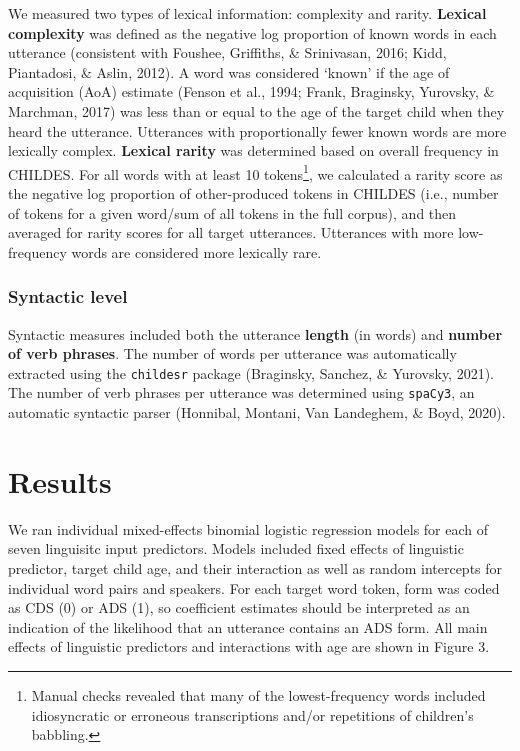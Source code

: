 \documentclass[10pt, letterpaper]{article}
\begin{document}
We measured two types of lexical information: complexity and rarity.
\textbf{Lexical complexity} was defined as the negative log proportion
of known words in each utterance (consistent with Foushee, Griffiths, \&
Srinivasan, 2016; Kidd, Piantadosi, \& Aslin, 2012). A word was
considered `known' if the age of acquisition (AoA) estimate (Fenson et
al., 1994; Frank, Braginsky, Yurovsky, \& Marchman, 2017) was less than
or equal to the age of the target child when they heard the utterance.
Utterances with proportionally fewer known words are more lexically
complex. \textbf{Lexical rarity} was determined based on overall
frequency in CHILDES. For all words with at least 10 tokens\footnote{Manual
  checks revealed that many of the lowest-frequency words included
  idiosyncratic or erroneous transcriptions and/or repetitions of
  children's babbling.}, we calculated a rarity score as the negative
log proportion of other-produced tokens in CHILDES (i.e., number of
tokens for a given word/sum of all tokens in the full corpus), and then
averaged for rarity scores for all target utterances. Utterances with
more low-frequency words are considered more lexically rare.

\hypertarget{syntactic-level}{%
\subsubsection{Syntactic level}\label{syntactic-level}}

Syntactic measures included both the utterance \textbf{length} (in
words) and \textbf{number of verb phrases}. The number of words per
utterance was automatically extracted using the \texttt{childesr}
package (Braginsky, Sanchez, \& Yurovsky, 2021). The number of verb
phrases per utterance was determined using \texttt{spaCy3}, an automatic
syntactic parser (Honnibal, Montani, Van Landeghem, \& Boyd, 2020).

\hypertarget{results-1}{%
\section{Results}\label{results-1}}

We ran individual mixed-effects binomial logistic regression models for
each of seven linguisitc input predictors. Models included fixed effects
of linguistic predictor, target child age, and their interaction as well
as random intercepts for individual word pairs and speakers. For each
target word token, form was coded as CDS (0) or ADS (1), so coefficient
estimates should be interpreted as an indication of the likelihood that
an utterance contains an ADS form. All main effects of linguistic
predictors and interactions with age are shown in Figure 3.
\end{document}
